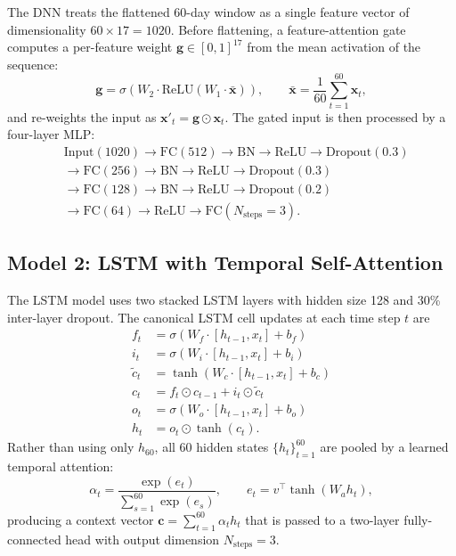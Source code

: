 \documentclass[12pt]{article}
\begin{document}
The DNN treats the flattened 60-day window as a single feature vector of dimensionality $60\times 17 = 1020$. Before flattening, a feature-attention gate computes a per-feature weight $\mathbf{g}\in[0,1]^{17}$ from the mean activation of the sequence:
\begin{equation}
    \mathbf{g} = \sigma\!\left(W_2 \cdot \mathrm{ReLU}(W_1 \cdot \bar{\mathbf{x}})\right),\qquad \bar{\mathbf{x}} = \frac{1}{60}\sum_{t=1}^{60} \mathbf{x}_t,
\end{equation}
and re-weights the input as $\mathbf{x}'_t = \mathbf{g} \odot \mathbf{x}_t$. The gated input is then processed by a four-layer MLP:
\begin{equation}
\begin{split}
    & \text{Input}(1020) \to \text{FC}(512) \to \text{BN} \to \text{ReLU} \to \text{Dropout}(0.3) \\
    & \to \text{FC}(256) \to \text{BN} \to \text{ReLU} \to \text{Dropout}(0.3) \\
    & \to \text{FC}(128) \to \text{BN} \to \text{ReLU} \to \text{Dropout}(0.2) \\
    & \to \text{FC}(64) \to \text{ReLU} \to \text{FC}(N_{\text{steps}}=3).
\end{split}
\end{equation}

\subsection{Model 2: LSTM with Temporal Self-Attention}

The LSTM model uses two stacked LSTM layers with hidden size 128 and 30\% inter-layer dropout. The canonical LSTM cell updates at each time step $t$ are
\begin{align}
    f_t &= \sigma(W_f \cdot [h_{t-1}, x_t] + b_f) \\
    i_t &= \sigma(W_i \cdot [h_{t-1}, x_t] + b_i) \\
    \tilde{c}_t &= \tanh(W_c \cdot [h_{t-1}, x_t] + b_c) \\
    c_t &= f_t \odot c_{t-1} + i_t \odot \tilde{c}_t \\
    o_t &= \sigma(W_o \cdot [h_{t-1}, x_t] + b_o) \\
    h_t &= o_t \odot \tanh(c_t).
\end{align}
Rather than using only $h_{60}$, all 60 hidden states $\{h_t\}_{t=1}^{60}$ are pooled by a learned temporal attention:
\begin{equation}
    \alpha_t = \frac{\exp(e_t)}{\sum_{s=1}^{60}\exp(e_s)},\qquad e_t = v^\top\tanh(W_a h_t),
\end{equation}
producing a context vector $\mathbf{c} = \sum_{t=1}^{60}\alpha_t h_t$ that is passed to a two-layer fully-connected head with output dimension $N_\text{steps} = 3$.
\end{document}
